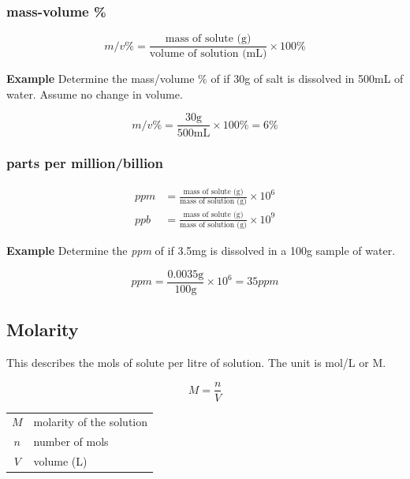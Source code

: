 \documentclass[11pt]{article}
\begin{document}
    \subsubsection{mass-volume \%}

    \begin{equation*}
        m/v \% = \frac{\text{mass of solute (g)}}{\text{volume of solution (mL)}} \times 100 \%
    \end{equation*}

    \textbf{Example} Determine the mass/volume \% of  if 30g of salt is dissolved in 500mL of water. Assume no change in volume.

    \begin{equation*}
        m/v \% = \frac{30\text{g}}{500\text{mL}} \times 100 \% = 6 \%
    \end{equation*}

    \subsubsection{parts per million/billion}

    \begin{equation*}
        \begin{aligned}
        ppm &= \frac{\text{mass of solute (g)}}{\text{mass of solution (g)}} \times 10^6 \\
        ppb &= \frac{\text{mass of solute (g)}}{\text{mass of solution (g)}} \times 10^9
        \end{aligned}
    \end{equation*}

    \textbf{Example} Determine the \emph{ppm} of  if 3.5mg is dissolved in a 100g sample of water.

    \begin{equation*}
        ppm = \frac{0.0035\text{g}}{100\text{g}} \times 10^6 = 35 ppm
    \end{equation*}

    \subsection{Molarity}
    This describes the mols of solute per litre of solution. The unit is mol/L or M.

    \begin{equation*}
        \boxed{M = \frac{n}{V}}
    \end{equation*}

    \begin{center}
        \begin{tabular}{c l}
            $M$ & molarity of the solution \\
            $n$ & number of mols \\
            $V$ & volume (L) \\   
        \end{tabular}
    \end{center}
\end{document}
